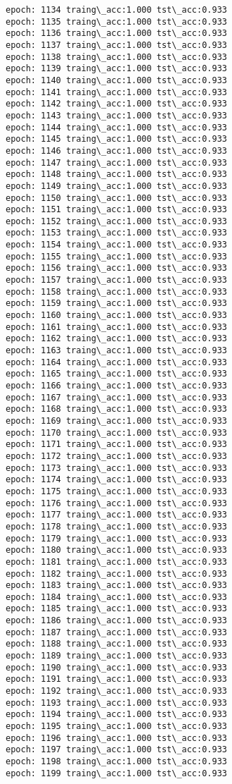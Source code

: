 \documentclass[11pt]{article}
\begin{document}
\begin{Verbatim}[commandchars=\\\{\}]
epoch: 1134 traing\_acc:1.000 tst\_acc:0.933
epoch: 1135 traing\_acc:1.000 tst\_acc:0.933
epoch: 1136 traing\_acc:1.000 tst\_acc:0.933
epoch: 1137 traing\_acc:1.000 tst\_acc:0.933
epoch: 1138 traing\_acc:1.000 tst\_acc:0.933
epoch: 1139 traing\_acc:1.000 tst\_acc:0.933
epoch: 1140 traing\_acc:1.000 tst\_acc:0.933
epoch: 1141 traing\_acc:1.000 tst\_acc:0.933
epoch: 1142 traing\_acc:1.000 tst\_acc:0.933
epoch: 1143 traing\_acc:1.000 tst\_acc:0.933
epoch: 1144 traing\_acc:1.000 tst\_acc:0.933
epoch: 1145 traing\_acc:1.000 tst\_acc:0.933
epoch: 1146 traing\_acc:1.000 tst\_acc:0.933
epoch: 1147 traing\_acc:1.000 tst\_acc:0.933
epoch: 1148 traing\_acc:1.000 tst\_acc:0.933
epoch: 1149 traing\_acc:1.000 tst\_acc:0.933
epoch: 1150 traing\_acc:1.000 tst\_acc:0.933
epoch: 1151 traing\_acc:1.000 tst\_acc:0.933
epoch: 1152 traing\_acc:1.000 tst\_acc:0.933
epoch: 1153 traing\_acc:1.000 tst\_acc:0.933
epoch: 1154 traing\_acc:1.000 tst\_acc:0.933
epoch: 1155 traing\_acc:1.000 tst\_acc:0.933
epoch: 1156 traing\_acc:1.000 tst\_acc:0.933
epoch: 1157 traing\_acc:1.000 tst\_acc:0.933
epoch: 1158 traing\_acc:1.000 tst\_acc:0.933
epoch: 1159 traing\_acc:1.000 tst\_acc:0.933
epoch: 1160 traing\_acc:1.000 tst\_acc:0.933
epoch: 1161 traing\_acc:1.000 tst\_acc:0.933
epoch: 1162 traing\_acc:1.000 tst\_acc:0.933
epoch: 1163 traing\_acc:1.000 tst\_acc:0.933
epoch: 1164 traing\_acc:1.000 tst\_acc:0.933
epoch: 1165 traing\_acc:1.000 tst\_acc:0.933
epoch: 1166 traing\_acc:1.000 tst\_acc:0.933
epoch: 1167 traing\_acc:1.000 tst\_acc:0.933
epoch: 1168 traing\_acc:1.000 tst\_acc:0.933
epoch: 1169 traing\_acc:1.000 tst\_acc:0.933
epoch: 1170 traing\_acc:1.000 tst\_acc:0.933
epoch: 1171 traing\_acc:1.000 tst\_acc:0.933
epoch: 1172 traing\_acc:1.000 tst\_acc:0.933
epoch: 1173 traing\_acc:1.000 tst\_acc:0.933
epoch: 1174 traing\_acc:1.000 tst\_acc:0.933
epoch: 1175 traing\_acc:1.000 tst\_acc:0.933
epoch: 1176 traing\_acc:1.000 tst\_acc:0.933
epoch: 1177 traing\_acc:1.000 tst\_acc:0.933
epoch: 1178 traing\_acc:1.000 tst\_acc:0.933
epoch: 1179 traing\_acc:1.000 tst\_acc:0.933
epoch: 1180 traing\_acc:1.000 tst\_acc:0.933
epoch: 1181 traing\_acc:1.000 tst\_acc:0.933
epoch: 1182 traing\_acc:1.000 tst\_acc:0.933
epoch: 1183 traing\_acc:1.000 tst\_acc:0.933
epoch: 1184 traing\_acc:1.000 tst\_acc:0.933
epoch: 1185 traing\_acc:1.000 tst\_acc:0.933
epoch: 1186 traing\_acc:1.000 tst\_acc:0.933
epoch: 1187 traing\_acc:1.000 tst\_acc:0.933
epoch: 1188 traing\_acc:1.000 tst\_acc:0.933
epoch: 1189 traing\_acc:1.000 tst\_acc:0.933
epoch: 1190 traing\_acc:1.000 tst\_acc:0.933
epoch: 1191 traing\_acc:1.000 tst\_acc:0.933
epoch: 1192 traing\_acc:1.000 tst\_acc:0.933
epoch: 1193 traing\_acc:1.000 tst\_acc:0.933
epoch: 1194 traing\_acc:1.000 tst\_acc:0.933
epoch: 1195 traing\_acc:1.000 tst\_acc:0.933
epoch: 1196 traing\_acc:1.000 tst\_acc:0.933
epoch: 1197 traing\_acc:1.000 tst\_acc:0.933
epoch: 1198 traing\_acc:1.000 tst\_acc:0.933
epoch: 1199 traing\_acc:1.000 tst\_acc:0.933
    \end{Verbatim}
\end{document}
